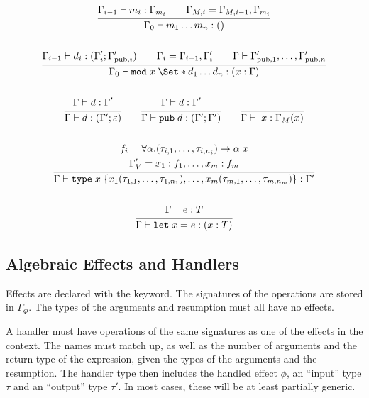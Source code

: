 \begin{gather*}
    \infer{
        \Gamma_0 \vdash m_1\dots m_n: ()
    }{
        \Gamma_{i-1} \vdash m_i: \Gamma_{m_i}
        \qquad
        \Gamma_{M,i} = \Gamma_{M,i-1}, \Gamma_{m_i}
    }
    \\\\
    \infer{
        \Gamma_0 \vdash \kw{mod}\;x\;\S{ d_1 \dots d_n }: (x: \Gamma)
    }{
        \Gamma_{i-1} \vdash d_i : (\Gamma'_i; \Gamma'_{\text{pub}, i})
        \qquad
        \Gamma_i = \Gamma_{i-1}, \Gamma'_i
        \qquad
        \Gamma \vdash \Gamma'_{\text{pub},1}, \dots, \Gamma'_{\text{pub},n}
    }
    \\\\
    \infer{
        \Gamma \vdash d : (\Gamma'; \varepsilon)
    }{
        \Gamma \vdash d : \Gamma'
    }
    \qquad
    \infer{
        \Gamma \vdash \kw{pub}\;d : (\Gamma'; \Gamma')
    }{
        \Gamma \vdash d : \Gamma'
    }
    \qquad
    \infer{
        \Gamma \vdash \;x : \Gamma_M(x)
    }{}
    \\\\
    \infer{
        \Gamma \vdash \type\;x \;
        \{ x_1(\tau_{1,1}, \dots, \tau_{1,n_1}), \dots, x_m(\tau_{m,1}, \dots, \tau_{m,n_m}) \} : \Gamma'
    }{
        f_i = \forall \alpha. (\tau_{i,1}, \dots, \tau_{i,n_i}) \to \alpha\;x
        \\
        \Gamma'_V = x_1: f_1,\dots,x_m: f_m
    }
    \\\\
    \infer{
        \Gamma \vdash \kw{let}\;x = e : (x: T)
    }{
        \Gamma \vdash e : T
    }
\end{gather*}

\subsection{Algebraic Effects and Handlers}
Effects are declared with the  keyword. The signatures of the operations are stored in $\Gamma_\Phi$. The types of the arguments and resumption must all have no effects.

A handler must have operations of the same signatures as one of the effects in the context. The names must match up, as well as the number of arguments and the return type of the expression, given the types of the arguments and the resumption. The handler type then includes the handled effect $\phi$, an ``input'' type $\tau$ and an ``output'' type $\tau'$. In most cases, these will be at least partially generic.

